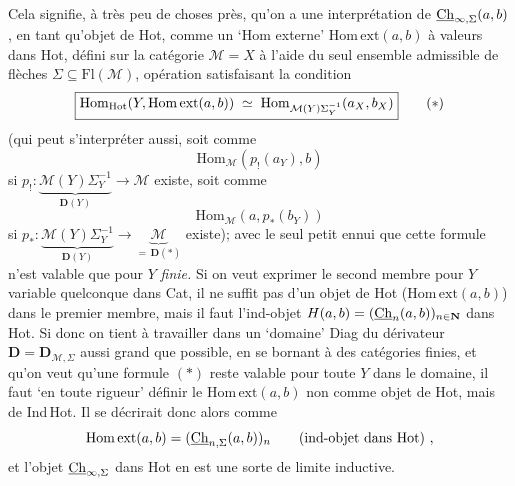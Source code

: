 Cela signifie, à très peu de choses près, qu'on a une interprétation de $\underline{\mathrm{Ch}}_{\infty,\Sigma}(a,b)$, en tant qu'objet de Hot, comme un `Hom externe' $\mathrm{Hom\,ext}(a,b)$ à valeurs dans Hot, défini sur la catégorie $\mathcal{M}=X$ à l'aide du seul ensemble admissible de flèches $\Sigma\subseteq\mathrm{Fl}(\mathcal{M})$, opération satisfaisant la condition
\[ \boxed{\mathrm{Hom}_{\Hot}(Y,\mathrm{Hom\,ext}(a,b)) \;\simeq\; \mathrm{Hom}_{\mathcal{M}(Y)\Sigma_Y^{-1}}(a_X,b_X)} \tag*{$(*)$} \]
(qui peut s'interpréter aussi, soit comme
\[ \mathrm{Hom}_{\mathcal{M}}(p_!(a_Y),b) \]
si $p_! : \underbrace{\mathcal{M}(Y)\Sigma_Y^{-1}}_{\mathbf{D}(Y)} \longrightarrow \mathcal{M}$ existe, soit comme
\[ \mathrm{Hom}_{\mathcal{M}}(a,p_*(b_Y)) \]
si $p_* : \underbrace{\mathcal{M}(Y)\Sigma_Y^{-1}}_{\mathbf{D}(Y)} \longrightarrow \underbrace{\mathcal{M}}_{=\,\mathbf{D}(*)}$ existe); avec le seul petit ennui que cette formule n'est valable que pour $Y$ \textit{finie.} Si on veut exprimer le second membre pour $Y$ variable quelconque dans Cat, il ne suffit pas d'un objet de Hot ($\mathrm{Hom\,ext}(a,b)$) dans le premier membre, mais il faut l'ind-objet $H(a,b) = (\underline{\mathrm{Ch}}_n(a,b))_{n\in\mathbf{N}}$ dans Hot. Si donc on tient à travailler dans un `domaine' Diag du dérivateur $\mathbf{D}=\mathbf{D}_{\mathcal{M},\Sigma}$ aussi grand que possible, en se bornant à des catégories finies,
et qu'on veut qu'une formule $(*)$ reste valable pour toute $Y$ dans le domaine, il faut `en toute rigueur' définir le $\mathrm{Hom\,ext}(a,b)$ non comme objet de Hot, mais de Ind\,Hot. Il se décrirait donc alors comme
\[ \mathrm{Hom\,ext}(a,b) = (\underline{\mathrm{Ch}}_{n,\Sigma}(a,b))_n \qquad \text{(ind-objet dans Hot)}\ , \]
et l'objet $\underline{\mathrm{Ch}}_{\infty,\Sigma}$ dans Hot en est une sorte de limite inductive.

